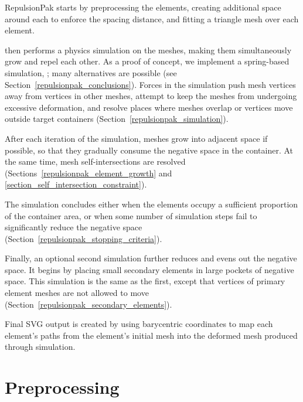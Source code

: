 RepulsionPak starts by preprocessing the elements, creating additional space around
each to enforce the spacing distance, and fitting a triangle mesh over each element.

 then performs a physics simulation on the meshes, 
making them simultaneously grow and repel each other. As a
proof of concept, we implement a spring-based 
simulation, ;
many alternatives are possible 
(see Section~\ref{repulsionpak_conclusions}).
Forces in the
simulation push mesh vertices away from vertices in other meshes,
attempt to keep the meshes from undergoing excessive deformation, and resolve
places where meshes overlap or vertices move outside target containers
(Section~\ref{repulsionpak_simulation}).

After each iteration of the simulation, meshes grow into adjacent space
if possible, so that they gradually consume the negative space in the container.
At the same time, mesh self-intersections are resolved
(Sections~\ref{repulsionpak_element_growth} and \ref{section_self_intersection_constraint}).

The simulation concludes 
either when the elements occupy a sufficient proportion of the container area, or 
when some number of simulation steps fail to
significantly reduce the negative space
(Section~\ref{repulsionpak_stopping_criteria}).

Finally, an optional second simulation further reduces and evens out the
negative space.  It begins by placing small secondary elements in large
pockets of negative space.  This simulation is the same as the
first, except that vertices of primary element meshes are not allowed to move
(Section~\ref{repulsionpak_secondary_elements}).

Final SVG output is created by using barycentric coordinates to map each element's
paths from the element's initial mesh into the deformed mesh produced through
simulation.


\section{Preprocessing}
\label{repulsionpak_preprocessing}

